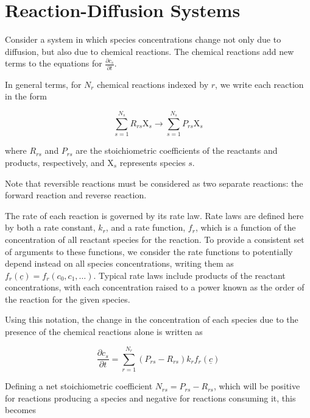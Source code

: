 
\section{Reaction-Diffusion Systems}\label{sec:reactionterms}

Consider a system in which species concentrations change not only due to diffusion,
but also due to chemical reactions.
The chemical reactions add new terms to the equations for $\frac{\partial c_s}{\partial t}$.

In general terms, for $N_r$ chemical reactions indexed by $r$,
we write each reaction in the form

\begin{equation}
  \sum_{s=1}^{N_s} R_{rs} \mathrm{X}_s \longrightarrow \sum_{s=1}^{N_s} P_{rs} \mathrm{X}_s
\end{equation}

where $R_{rs}$ and $P_{rs}$ are the stoichiometric coefficients
of the reactants and products, respectively,
and $\mathrm{X}_s$ represents species $s$.

Note that reversible reactions must be considered as two separate reactions:
the forward reaction and reverse reaction.

The rate of each reaction is governed by its rate law.
Rate laws are defined here by both a rate constant, $k_r$,
and a rate function, $f_r$, which is a function of the concentration
of all reactant species for the reaction.
To provide a consistent set of arguments to these functions,
we consider the rate functions to potentially depend instead
on all species concentrations,
writing them as $f_r\left(\underline{c}\right) = f_r\left(c_0, c_1, \ldots \right)$.
Typical rate laws include products of the reactant concentrations,
with each concentration raised to a power known as the order of the reaction
for the given species.

Using this notation, the change in the concentration of each species
due to the presence of the chemical reactions alone is written as

\begin{equation}
  \frac{\partial c_s}{\partial t} = 
  \sum_{r=1}^{N_r} \left( P_{rs} - R_{rs} \right) k_r f_r\left(\underline{c}\right)
\end{equation}

Defining a net stoichiometric coefficient $N_{rs} = P_{rs} - R_{rs}$,
which will be positive for reactions producing a species and negative
for reactions consuming it, this becomes

